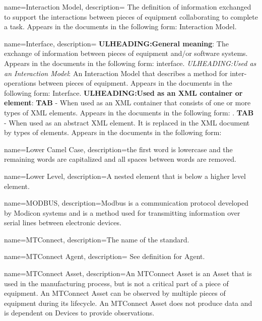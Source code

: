 {
    name={Interaction Model},
	description={
	The definition of information exchanged to support the interactions between pieces of equipment collaborating to complete a task.
	Appears in the documents in the following form: \gls{Interaction Model}.
}
}

{
    name={Interface},
	description={
	\textbf{ULHEADING:General meaning}:
	The exchange of information between pieces of equipment and/or software systems.
	Appears in the documents in the following form: interface.
	\textit{ULHEADING:Used as an \gls{Interaction Model}}:
	An \gls{Interaction Model} that describes a method for inter-operations between pieces of equipment.
	Appears in the documents in the following form: \gls{Interface}.
	\textbf{ULHEADING:Used as an XML container or element}:
	\textbf{TAB} - When used as an XML container that consists of one or more types of  XML elements.
	Appears in the documents in the following form: .
	\textbf{TAB} - When used as an abstract XML element.  It is replaced in the XML document by types of  elements.
	Appears in the documents in the following form: 
}
}

{
    name={Lower Camel Case},
	description={the first word is lowercase and the remaining words are capitalized and all spaces between words are removed.}
}

{
    name={Lower Level},
	description={A nested element that is below a higher level element.}
}

{
    name={MODBUS},
	description={Modbus is a communication protocol developed by Modicon systems and is a method used for transmitting information over serial lines between electronic devices.}
}

{
    name={MTConnect},
	description={The name of the standard.}
}

{
    name={MTConnect Agent},
	description={
	See definition for \gls{Agent}.
}
}

{
    name={MTConnect Asset},
	description={An \gls{MTConnect Asset} is an \gls{Asset} that is used in the manufacturing process, but is not a critical part of a piece of equipment. An \gls{MTConnect Asset} can be observed by multiple pieces of equipment during its lifecycle.
An \gls{MTConnect Asset} does not produce data and is dependent on \gls{Devices} to provide observations.
}
}

